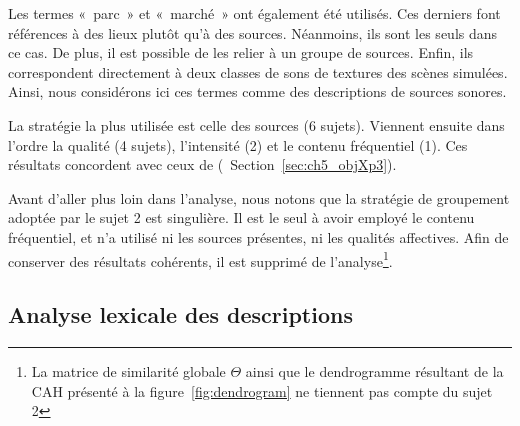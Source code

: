 Les termes «~parc~» et «~marché~» ont également été utilisés. Ces derniers font références à des lieux plutôt qu'à des sources. Néanmoins, ils sont les seuls dans ce cas. De plus, il est possible de les relier à un groupe de sources. Enfin, ils correspondent directement à deux classes de sons de textures des scènes simulées. Ainsi, nous considérons ici ces termes comme des descriptions de sources sonores.

La stratégie la plus utilisée est celle des sources (6 sujets). Viennent ensuite dans l'ordre la qualité (4 sujets), l'intensité (2) et le contenu fréquentiel (1). Ces résultats concordent avec ceux de \cite{maffiolo_caracterisation_1999} (\cf~Section~\ref{sec:ch5_objXp3}).

Avant d'aller plus loin dans l'analyse, nous notons que la stratégie de groupement adoptée par le sujet 2 est singulière. Il est le seul à avoir employé le contenu fréquentiel, et n'a utilisé ni les sources présentes, ni les qualités affectives. Afin de conserver des résultats cohérents, il est supprimé de l'analyse\footnote{La matrice de similarité globale $\Theta$ ainsi que le dendrogramme résultant de la CAH présenté à la figure~\ref{fig:dendrogram} ne tiennent pas compte du sujet 2}. 

\subsection{Analyse lexicale des descriptions}
\label{sec:ch5_xp3AnalyseLexicale}

